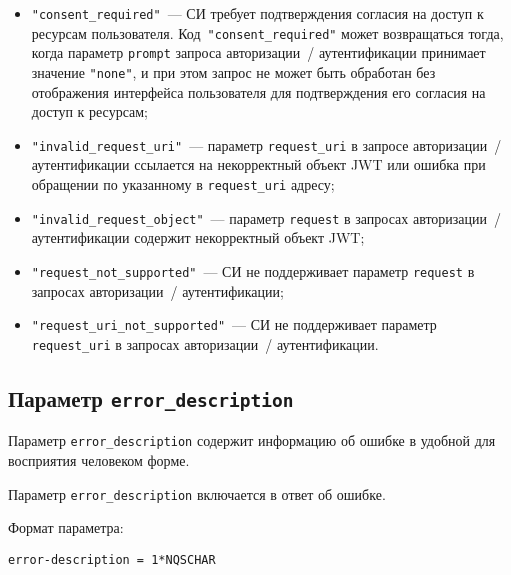 \begin{itemize}
\item
\lstinline{"consent_required"}~--- 
СИ требует подтверждения согласия на доступ к ресурсам пользователя.
%
Код~\lstinline{"consent_required"} может возвращаться тогда, когда 
параметр \lstinline{prompt} запроса авторизации~/ аутентификации 
принимает значение \lstinline{"none"}, и при этом запрос не 
может быть обработан без отображения интерфейса пользователя для подтверждения 
его согласия на доступ к ресурсам; 

\item
\lstinline{"invalid_request_uri"}~---
параметр \lstinline{request_uri} в запросе авторизации~/ аутентификации 
ссылается на некорректный объект JWT или ошибка при обращении  
по указанному в \lstinline{request_uri} адресу; 

\item
\lstinline{"invalid_request_object"}~--- 
параметр \lstinline{request} в запросах авторизации~/ аутентификации содержит 
некорректный объект JWT; 

\item
\lstinline{"request_not_supported"}~---
СИ не поддерживает параметр \lstinline{request} в запросах авторизации~/ 
аутентификации;

\item
\lstinline{"request_uri_not_supported"}~---
СИ не поддерживает параметр \lstinline{request_uri} в запросах 
авторизации~/ аутентификации.
\end{itemize}


\subsection{Параметр \lstinline{error_description}}\label{PARAMS.ErrorDescr}

Параметр \lstinline{error_description} содержит информацию об ошибке в удобной 
для восприятия человеком форме.

Параметр \lstinline{error_description} включается в ответ об ошибке.


Формат параметра:
\begin{lstlisting}
error-description = 1*NQSCHAR
\end{lstlisting}

